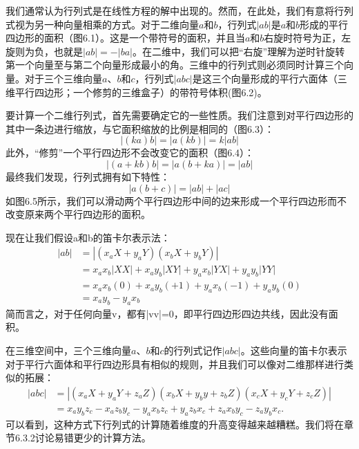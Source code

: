 \documentclass[lang=cn,12pt,marginpar=margintrue]{elegantbook}
\begin{document}

我们通常认为行列式是在线性方程的解中出现的。然而，在此处，我们有意将行列式视为另一种向量相乘的方式。对于二维向量$a$和$b$，行列式$|ab|$是$a$和$b$形成的平行四边形的面积（图6.1）。这是一个带符号的面积，并且当$a$和$b$右旋时符号为正，左旋则为负，也就是$|ab| = -|ba|$。在二维中，我们可以把“右旋”理解为逆时针旋转第一个向量至与第二个向量形成最小的角。三维中的行列式则必须同时计算三个向量。对于三个三维向量$a$、$b$和$c$，行列式$|abc|$是这三个向量形成的平行六面体（三维平行四边形；一个修剪的三维盒子）的带符号体积(图6.2)。

要计算一个二维行列式，首先需要确定它的一些性质。我们注意到对平行四边形的其中一条边进行缩放，与它面积缩放的比例是相同的（图6.3）：
\[
  |(ka)b| =  |a(kb)| = k|ab|
\]
此外，“修剪”一个平行四边形不会改变它的面积（图6.4）：
\[
  |(a+kb)b| =  |a(b+ka)| = |ab|
\]
最终我们发现，行列式拥有如下特性：
\begin{equation}
  |a(b+c)| =  |ab| + |ac|
\end{equation}
如图6.5所示，我们可以滑动两个平行四边形中间的边来形成一个平行四边形而不改变原来两个平行四边形的面积。

现在让我们假设a和b的笛卡尔表示法：
\[
  \begin{aligned}
    |ab| & = |(x_aX + y_aY)(x_bX + y_bY)| \nonumber               \\
         & =x_ax_b|XX|+x_ay_b|XY|+y_ax_b|YX|+y_ay_b|YY| \nonumber \\
         & =x_ax_b(0)+x_ay_b(+1)+y_ax_b(-1)+y_ay_b(0) \nonumber   \\
         & = x_a y_b - y_a x_b \nonumber
  \end{aligned}
\]
简而言之，对于任何向量v，都有|vv|=0，即平行四边形四边共线，因此没有面积。

在三维空间中，三个三维向量$a$、$b$和$c$的行列式记作$|abc|$。这些向量的笛卡尔表示对于平行六面体和平行四边形具有相似的规则，并且我们可以像对二维那样进行类似的拓展：
\begin{equation}
  \begin{aligned}
    |abc| & = |(x_aX+y_aY+z_aZ)(x_bX+y_by+z_bZ)(x_cX+y_cY+z_cZ)| \nonumber          \\
          & =x_ay_bz_c-x_az_by_c-y_ax_bz_c+y_az_bx_c+z_ax_by_c-z_ay_bx_c \nonumber.
  \end{aligned}
\end{equation}
可以看到，这种方式下行列式的计算随着维度的升高变得越来越糟糕。我们将在章节6.3.2讨论易错更少的计算方法。
\end{document}

